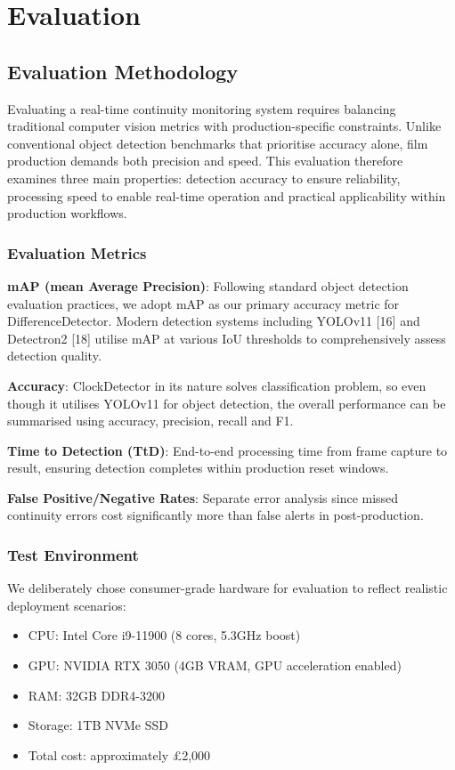 \chapter{Evaluation}

\section{Evaluation Methodology}
Evaluating a real-time continuity monitoring system requires balancing traditional computer vision metrics with production-specific constraints. Unlike conventional object detection benchmarks that prioritise accuracy alone, film production demands both precision and speed. This evaluation therefore examines three main properties: detection accuracy to ensure reliability, processing speed to enable real-time operation and practical applicability within production workflows.

\subsection{Evaluation Metrics}
\textbf{mAP (mean Average Precision)}: Following standard object detection evaluation practices, we adopt mAP as our primary accuracy metric for DifferenceDetector. Modern detection systems including YOLOv11 [16] and Detectron2 [18] utilise mAP at various IoU thresholds to comprehensively assess detection quality.

\textbf{Accuracy}: ClockDetector in its nature solves classification problem, so even though it utilises YOLOv11 for object detection, the overall performance can be summarised using accuracy, precision, recall and F1.

\textbf{Time to Detection (TtD)}: End-to-end processing time from frame capture to result, ensuring detection completes within production reset windows.

\textbf{False Positive/Negative Rates}: Separate error analysis since missed continuity errors cost significantly more than false alerts in post-production.

\subsection{Test Environment}
We deliberately chose consumer-grade hardware for evaluation to reflect realistic deployment scenarios:
\begin{itemize}
\item CPU: Intel Core i9-11900 (8 cores, 5.3GHz boost)
\item GPU: NVIDIA RTX 3050 (4GB VRAM, GPU acceleration enabled)
\item RAM: 32GB DDR4-3200
\item Storage: 1TB NVMe SSD
\item Total cost: approximately £2,000
\end{itemize}

